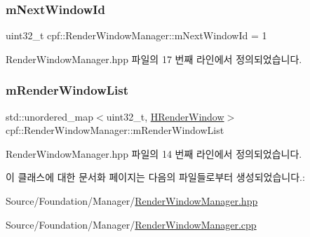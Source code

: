 \subsubsection{\texorpdfstring{m\+Next\+Window\+Id}{mNextWindowId}}
{\footnotesize\ttfamily uint32\+\_\+t cpf\+::\+Render\+Window\+Manager\+::m\+Next\+Window\+Id = 1\hspace{0.3cm}{\ttfamily [private]}}



Render\+Window\+Manager.\+hpp 파일의 17 번째 라인에서 정의되었습니다.

\mbox{\label{classcpf_1_1_render_window_manager_a06f8628fd71091311dd2cbb908f744a2}} 
\subsubsection{\texorpdfstring{m\+Render\+Window\+List}{mRenderWindowList}}
{\footnotesize\ttfamily std\+::unordered\+\_\+map$<$uint32\+\_\+t, \hyperlink{namespacecpf_af5ffcc39bb6465427fc3b91366c917f6}{H\+Render\+Window}$>$ cpf\+::\+Render\+Window\+Manager\+::m\+Render\+Window\+List\hspace{0.3cm}{\ttfamily [private]}}



Render\+Window\+Manager.\+hpp 파일의 14 번째 라인에서 정의되었습니다.



이 클래스에 대한 문서화 페이지는 다음의 파일들로부터 생성되었습니다.\+:\begin{DoxyCompactItemize}
\item 
Source/\+Foundation/\+Manager/\hyperlink{_render_window_manager_8hpp}{Render\+Window\+Manager.\+hpp}\item 
Source/\+Foundation/\+Manager/\hyperlink{_render_window_manager_8cpp}{Render\+Window\+Manager.\+cpp}\end{DoxyCompactItemize}
